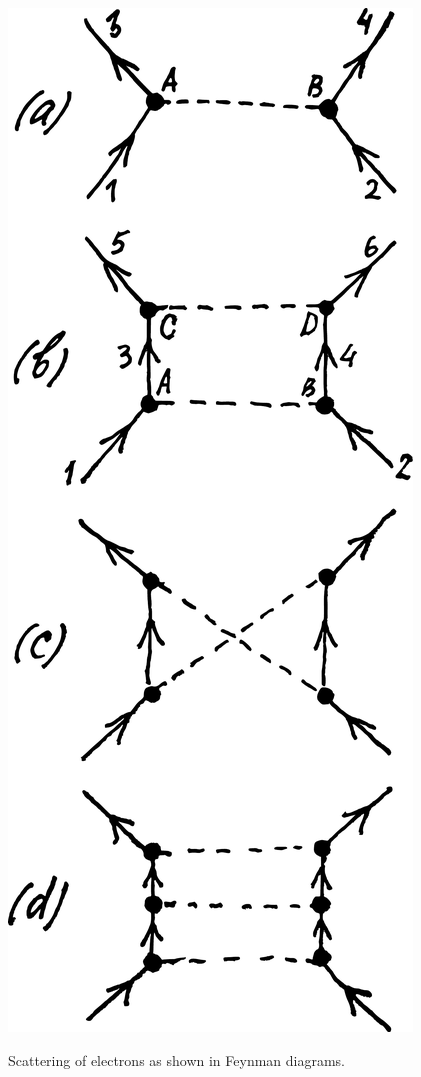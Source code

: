 \documentclass[a4paper,sfsidenotes,colorlinks=true]{tufte-book}
\numberwithin{equation}{section}
\numberwithin{figure}{section}
\begin{document}
\begin{marginfigure}%
\centering
\includegraphics[width=0.9\linewidth]{figures/fig-06-01.pdf}
\caption{Scattering of electrons as shown in Feynman diagrams.}
\label{fig-6.1}
\end{marginfigure}
\end{document}
